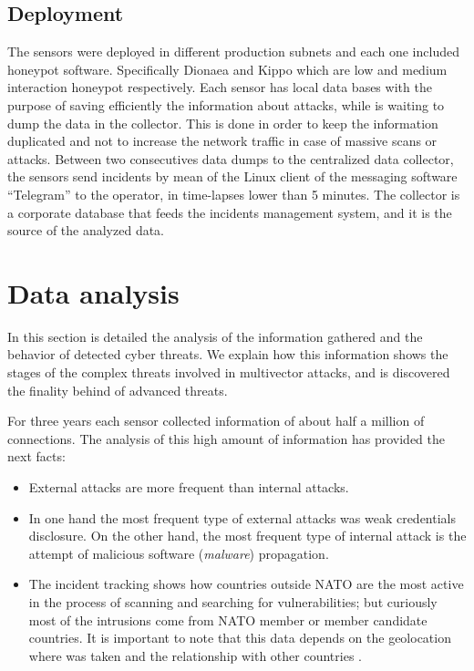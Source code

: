 \documentclass[a4paper]{llncs}
\begin{document}
\subsection{Deployment}
The sensors were deployed in different production subnets and each one included honeypot software. Specifically Dionaea\cite{dionaea} and Kippo\cite{kippo} which are low and medium interaction honeypot respectively. Each sensor has local data bases with the purpose of saving efficiently the information about attacks, while is waiting to dump the data in the collector. This is done in order to keep the information duplicated and not to increase the network traffic in case of massive scans or attacks. Between two consecutives data dumps to the centralized data collector, the sensors send incidents by mean of the Linux client of the messaging software ``Telegram''\cite{telegram-messenger} to the operator, in time-lapses lower than 5 minutes. The collector is a corporate database that feeds the incidents management system, and it is the source of the analyzed data.

\section{Data analysis}
\label{sec:analysis}
In this section is detailed the analysis of the information gathered and the behavior of detected cyber threats. We explain how this information shows the stages of the complex threats involved in multivector attacks, and is discovered the finality behind of advanced threats.

For three years each sensor collected information of about half a million of connections. The analysis of this high amount of information has provided the next facts:
\begin{itemize}
	\item External attacks are more frequent than internal attacks.
	\item In one hand the most frequent type of external attacks was weak credentials disclosure. On the other hand, the most frequent type of internal attack is the attempt of malicious software ({\it malware}) propagation.
	\item The incident tracking shows how countries outside NATO are the most active in the process of scanning and searching for vulnerabilities; but curiously most of the intrusions come from NATO member or member candidate countries. It is important to note that this data depends on the geolocation where was taken and the relationship with other countries \cite{wiki-cyberwarfare-china,wiki-cyberwarfare-eeuu}.
\end{itemize}
\end{document}

